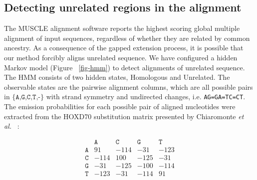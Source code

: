 \documentclass[12pt,journal,draftcls,letterpaper,onecolumn]{IEEEtran}
\begin{document}
\subsection{Detecting unrelated regions in the alignment}
\begin{figure*}[t!]
\centering {}
\caption[Hidden Markov model used to detect pairwise alignments of unrelated
sequence]%
{\textbf{Hidden Markov model used to detect pairwise alignments of unrelated
sequence.} The HMM has states which model alignment columns containing
homologous and unrelated sequence. Emission probabilities are extracted from the HOXD70 substitution matrix and correspond to alignment
columns, for example \texttt{AA} indicates A aligned to A.  gO
indicates gap-open and gE gap extend. Alignment columns are treated as
strand-symmetric, so that AC also indicates CA and the reverse
complements TG and GT.  The emission probabilities are adjusted to the G+C content of the input genome
as described in the text.  The values shown here correspond to a 47.5\% G+C genome.}
\label{fig-hmm}
\end{figure*}
The MUSCLE alignment software reports the highest scoring
global multiple alignment of input sequences, regardless of whether
they are related by common ancestry. As a consequence of the gapped
extension process, it is possible that our method forcibly aligns unrelated
sequence. We have configured a hidden Markov model (Figure
~\ref{fig-hmm}) to detect alignments of unrelated sequence. The HMM
consists of two hidden states, Homologous and Unrelated. The
observable states are the pairwise alignment columns, which are all
possible pairs in $\texttt{{\{A,G,C,T,-\}}}$ with strand
symmetry and undirected changes, i.e. \texttt{AG=GA=TC=CT}. The emission probabilities for
each possible pair of aligned nucleotides were extracted from the HOXD70
substitution matrix presented by Chiaromonte \textit{et al.}~\cite{hoxd} :
\large
\begin{center}
\begin{equation}
\begin{array}{crrrr}
  & \texttt{A} & \texttt{C} & \texttt{G} & \texttt{T} \\
\texttt{A} & 91 & -114 & -31 & -123 \\
\texttt{C} & -114 & 100 & -125 & -31 \\
\texttt{G} & -31 & -125 & -100 & -114 \\
\texttt{T} & -123 & -31 & -114 & 91 \\ \end{array}
\end{equation}
\end{center}
\end{document}
